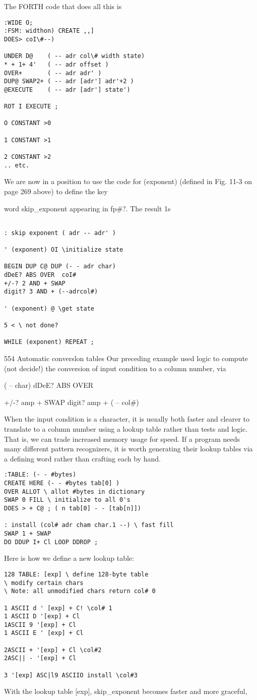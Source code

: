 \documentclass{book}
\begin{document}
The FORTH code that does all this is
\begin{lstlisting}
:WIDE O;
:FSM: widthon) CREATE ,,]
DOES> coI\#--)

UNDER D@    ( -- adr col\# width state)
* + 1+ 4'   ( -- adr offset )
OVER+       ( -- adr adr' )
DUP@ SWAP2+ ( -- adr [adr'] adr'+2 )
@EXECUTE    ( -- adr [adr'] state')

ROT I EXECUTE ;

O CONSTANT >0

1 CONSTANT >1

2 CONSTANT >2
.. etc.

\end{lstlisting}

We are now in a position to use the code for (exponent)
(defined in Fig. 11-3 on page 269 above) to define the key

word skip\_exponent appearing in fp\#?. The result 1s

\begin{lstlisting}

: skip exponent ( adr -- adr' )

' (exponent) OI \initialize state

BEGIN DUP C@ DUP (- - adr char)
dDeE? ABS OVER  coI#
+/-? 2 AND + SWAP
digit? 3 AND + (--adrcol#)

' (exponent) @ \get state

5 < \ not done?

WHILE (exponent) REPEAT ;
\end{lstlisting}
554 Automatic converslon tables
Our preceding example used logic to compute (not decide!) the
conversion of input condition to a column number, via

( -- char) dDeE? ABS OVER

+/-? amp + SWAP
digit? amp + ( -- col\#)


When the input condition is a character, it is usually both faster
and clearer to translate to a column number using a lookup table
rather than tests and logic. That is, we can trade increased
memory usage for speed. If a program needs many different
pattern recognizers, it is worth generating their lookup tables via
a defining word rather than crafting each by hand.
\begin{lstlisting}
:TABLE: (- - #bytes)
CREATE HERE (- - #bytes tab[0] )
OVER ALLOT \ allot #bytes in dictionary
SWAP 0 FILL \ initialize to all 0's
DOES > + C@ ; ( n tab[0] - - [tab[n]])

: install (col# adr cham char.1 --) \ fast fill
SWAP 1 + SWAP
DO DDUP I+ Cl LOOP DDROP ;
\end{lstlisting}
Here is how we define a new lookup table:
\begin{lstlisting}
128 TABLE: [exp] \ define 128-byte table
\ modify certain chars
\ Note: all unmodified chars return col# 0

1 ASCII d ' [exp] + C! \col# 1
1 ASCII D '[exp] + Cl
1ASCII 9 '[exp] + Cl
1 ASCII E ' [exp] + Cl

2ASCII + '[exp] + Cl \col#2
2ASC|| - '[exp] + Cl

3 '[exp] ASC|l9 ASCIIO install \col#3
\end{lstlisting}
With the lookup table [exp], skip\_exponent becomes faster
and more graceful,
\end{document}
